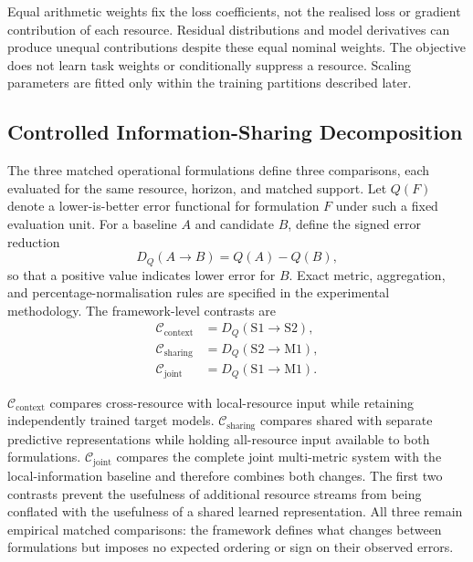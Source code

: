 \documentclass[a4paper,fleqn]{cas-dc}
\begin{document}
Equal arithmetic weights fix the loss coefficients, not the realised loss or
gradient contribution of each resource. Residual distributions and model
derivatives can produce unequal contributions despite these equal nominal
weights. The objective does not learn task weights or conditionally suppress
a resource. Scaling parameters are fitted only within the training partitions
described later.

\subsection{Controlled Information-Sharing Decomposition}
\label{sec:decomposition}

The three matched operational formulations define three comparisons, each evaluated for the same
resource, horizon, and matched support. Let $Q(F)$ denote a lower-is-better
error functional for formulation $F$ under such a fixed evaluation unit. For
a baseline $A$ and candidate $B$, define the signed error reduction
\begin{equation}
  D_Q(A\rightarrow B)=Q(A)-Q(B),
  \label{eq:controlled-reduction}
\end{equation}
so that a positive value indicates lower error for $B$. Exact metric,
aggregation, and percentage-normalisation rules are specified in the
experimental methodology. The framework-level contrasts are
\begin{equation}
  \begin{aligned}
    \mathcal{C}_{\mathrm{context}}
      &= D_Q(\mathrm{S1}\rightarrow\mathrm{S2}), \\
    \mathcal{C}_{\mathrm{sharing}}
      &= D_Q(\mathrm{S2}\rightarrow\mathrm{M1}), \\
    \mathcal{C}_{\mathrm{joint}}
      &= D_Q(\mathrm{S1}\rightarrow\mathrm{M1}).
  \end{aligned}
  \label{eq:controlled-contrasts}
\end{equation}

$\mathcal{C}_{\mathrm{context}}$ compares cross-resource with local-resource
input while retaining independently trained target models.
$\mathcal{C}_{\mathrm{sharing}}$ compares shared with separate predictive
representations while holding all-resource input available to both
formulations. $\mathcal{C}_{\mathrm{joint}}$ compares the complete joint
multi-metric system with the local-information baseline and therefore combines
both changes. The first two contrasts prevent the usefulness of additional
resource streams from being conflated with the usefulness of a shared learned
representation. All three remain empirical matched comparisons: the framework
defines what changes between formulations but imposes no expected ordering or
sign on their observed errors.
\end{document}
